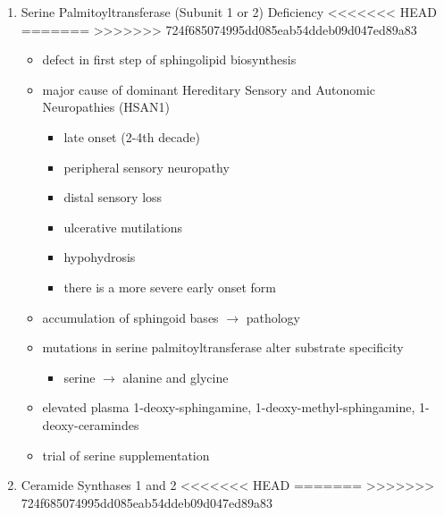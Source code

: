 \documentclass[fontsize=12pt]{scrartcl}
\begin{document}
\begin{enumerate}
\begin{enumerate}
\begin{enumerate}
\begin{enumerate}
\begin{enumerate}
\item Serine Palmitoyltransferase (Subunit 1 or 2) Deficiency
<<<<<<< HEAD
\label{sec:org073ef19}
=======
\label{sec:org9f35098}
>>>>>>> 724f685074995dd085eab54ddeb09d047ed89a83
\begin{itemize}
\item defect in first step of sphingolipid biosynthesis
\item major cause of dominant Hereditary Sensory and Autonomic Neuropathies (HSAN1)
\begin{itemize}
\item late onset (2-4th decade)
\item peripheral sensory neuropathy
\item distal sensory loss
\item ulcerative mutilations
\item hypohydrosis
\item there is a more severe early onset form
\end{itemize}
\item accumulation of sphingoid bases \(\to\) pathology
\item mutations in serine palmitoyltransferase alter
substrate specificity
\begin{itemize}
\item serine \(\to\) alanine and glycine
\end{itemize}
\item elevated plasma 1-deoxy-sphingamine, 1-deoxy-methyl-sphingamine, 1-deoxy-ceramindes
\item trial of serine supplementation
\end{itemize}

\item Ceramide Synthases 1 and 2
<<<<<<< HEAD
\label{sec:orgffbcc33}
=======
\label{sec:orgea6ff1c}
>>>>>>> 724f685074995dd085eab54ddeb09d047ed89a83


\end{enumerate}
\end{enumerate}
\end{enumerate}
\end{enumerate}
\end{enumerate}
\end{document}
